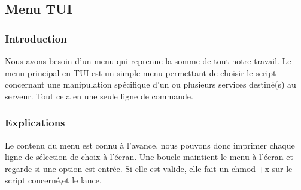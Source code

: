 \documentclass{article}
\begin{document}
	




	
%
	
	\subsection{Menu TUI}
	\subsubsection{Introduction}
	Nous avons besoin d'un menu qui reprenne la somme de tout notre travail. Le menu principal en TUI est un simple menu permettant de choisir le script concernant une manipulation spécifique d'un ou plusieurs services destiné(s) au serveur. Tout cela en une seule ligne de commande.

	\subsubsection{Explications}
	Le contenu du menu est connu à l'avance, nous pouvons donc imprimer chaque ligne de sélection de choix à l'écran.
	Une boucle maintient le menu à l'écran et regarde si une option est entrée. Si elle est valide, elle fait un chmod +x sur le script concerné,et le lance.
	
\end{document}
